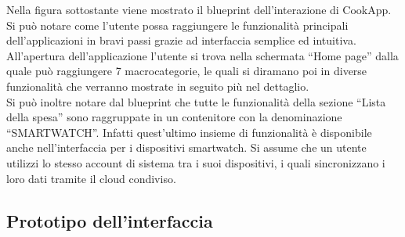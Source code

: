 Nella figura sottostante viene mostrato il blueprint dell'interazione
di CookApp. Si può notare come l'utente possa raggiungere le
funzionalità principali dell'applicazioni in bravi passi grazie ad
interfaccia semplice ed intuitiva. All'apertura dell'applicazione
l'utente si trova nella schermata ``Home page'' dalla quale può raggiungere 7
macrocategorie, le quali si diramano poi in diverse funzionalità che verranno
mostrate in seguito più nel dettaglio.\\
Si può inoltre notare dal blueprint che tutte le funzionalità della
sezione ``Lista della spesa''  sono raggruppate in un contenitore con la
denominazione ``SMARTWATCH''. Infatti quest'ultimo insieme di
funzionalità è disponibile anche nell'interfaccia per i dispositivi
smartwatch. Si assume che un utente utilizzi lo stesso account di
sistema tra i suoi dispositivi, i quali sincronizzano i loro dati
tramite il cloud condiviso.


\begin{landscape}
\begin{figure}[ht]
\centering
{}
\label{fig:blueprint}
\end{figure}
\end{landscape}


\subsection{Prototipo dell'interfaccia}
